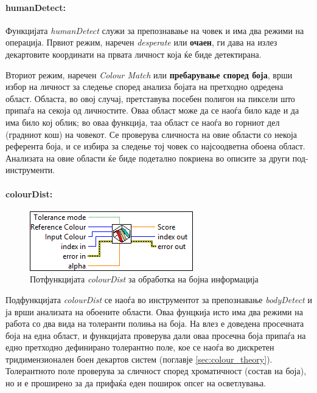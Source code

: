 \documentclass[12pt]{article}
\begin{document}
    \paragraph{humanDetect:\\}
      Функцијата \textit{humanDetect} служи за препознавање на човек и има два режими на операција. Првиот режим, наречен \textit{desperate} или \textbf{очаен}, ги дава на излез декартовите координати на првата личност која ќе биде детектирана.

      Вториот режим, наречен \textit{Colour Match} или \textbf{пребарување според боја}, врши избор на личност за следење според анализа бојата на претходно одредена област. Областа, во овој случај, претставува посебен полигон на пиксели што припаѓа на секоја од личностите. Оваа област може да се наоѓа било каде и да има било кој облик; во оваа функција, таа област се наоѓа во горниот дел (градниот кош) на човекот. Се проверува сличноста на овие области со некоја референта боја, и се избира за следење тој човек со најсоодветна обоена област. Анализата на овие области ќе биде подетално покриена во описите за други под-инструменти.

    \paragraph{colourDist:\\}
	\begin{figure}[H]
	    \includegraphics[width=0.55\linewidth]{./images/colourDist_border.PNG}
		\caption{Потфункцијата \textit{colourDist} за обработка на бојна информација}
	    \label{fig:colourDist.PNG}
	    \raggedright
	    \end{figure}
      Подфункцијата \textit{colourDist} се наоѓа во инструментот за препознавање \textit{bodyDetect} и ја врши анализата на обоените области. Оваа фунцкија исто има два режими на работа со два вида на толеранти полиња на боја. На влез е доведена просечната боја на една област, и функцијата проверува дали оваа просечна боја припаѓа на едно претходно дефинирано толерантно поле, кое се наоѓа во дискретен тридимензионален боен декартов систем (поглавје \ref{sec:colour_theory}). Толерантното поле проверува за сличност според хроматичност (состав на боја), но и е проширено за да прифаќа еден поширок опсег на осветлувања.
\end{document}
